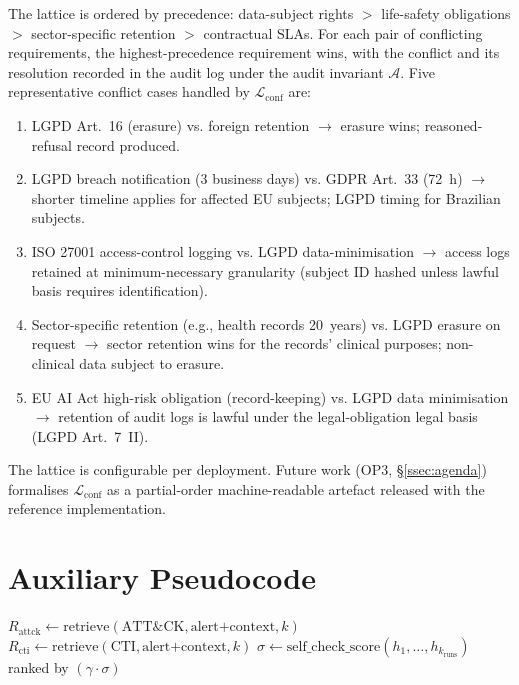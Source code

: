 \documentclass[preprint,12pt,authoryear]{elsarticle}
\begin{document}
The lattice is ordered by precedence: data-subject rights $>$ life-safety obligations $>$ sector-specific retention $>$ contractual SLAs. For each pair of conflicting requirements, the highest-precedence requirement wins, with the conflict and its resolution recorded in the audit log under the audit invariant $\mathcal{A}$. Five representative conflict cases handled by $\mathcal{L}_{\text{conf}}$ are:
\begin{enumerate}
\item LGPD Art.~16 (erasure) vs. foreign retention $\to$ erasure wins; reasoned-refusal record produced.
\item LGPD breach notification (3 business days) vs. GDPR Art.~33 (72~h) $\to$ shorter timeline applies for affected EU subjects; LGPD timing for Brazilian subjects.
\item ISO 27001 access-control logging vs. LGPD data-minimisation $\to$ access logs retained at minimum-necessary granularity (subject ID hashed unless lawful basis requires identification).
\item Sector-specific retention (e.g., health records 20~years) vs. LGPD erasure on request $\to$ sector retention wins for the records' clinical purposes; non-clinical data subject to erasure.
\item EU AI Act high-risk obligation (record-keeping) vs. LGPD data minimisation $\to$ retention of audit logs is lawful under the legal-obligation legal basis (LGPD Art.~7~II).
\end{enumerate}
The lattice is configurable per deployment. Future work (OP3, §\ref{ssec:agenda}) formalises $\mathcal{L}_{\text{conf}}$ as a partial-order machine-readable artefact released with the reference implementation.

\section{Auxiliary Pseudocode}
\label{app:pseudocode}
\begin{algorithm}[H]
\caption{PC1; Threat Hunting Hypothesis Generation via RAG}
$R_{\text{attck}} \gets \text{retrieve}(\text{ATT\&CK}, \text{alert+context}, k)$\;
$R_{\text{cti}}   \gets \text{retrieve}(\text{CTI}, \text{alert+context}, k)$\;
$\sigma \gets \text{self\_check\_score}(h_1, \dots, h_{k_{\text{runs}}})$\;
\Return \textnormal{ranked by} $(\gamma \cdot \sigma)$
\end{algorithm}
\end{document}

